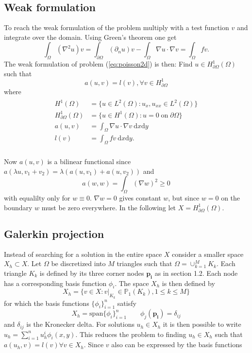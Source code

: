 \documentclass[paper=a4, fontsize=11pt]{scrartcl} %
\begin{document}
\subsection{Weak formulation}
To reach the weak formulation of the problem multiply with a test function $v$ and integrate over the domain. Using Green's theorem one get 
\[\int_{\Omega}  (\nabla^2u)v = \int_{\partial\Omega} (\partial_n u) v -\int_{\Omega} \nabla u \cdot \nabla v = \int_{\Omega} f v.\]
The weak formulation of problem (\ref{eq:poisson2d}) is then: Find $u\in H^1_{\partial\Omega}(\Omega)$ such that
\[a(u,v) = l(v), \forall v \in H^1_{\partial\Omega}\]
where 
\begin{eqnarray}
\begin{aligned}
H^1(\Omega) &= \{u \in L^2(\Omega) : u_x, u_{xx} \in L^2(\Omega)\} \\
H^1_{\partial\Omega}(\Omega) &= \{u\in H^1(\Omega) : u=0 \; \mathrm{on} \;  \partial\Omega\} \\
a(u,v) &= \int_{\Omega} \nabla u\cdot\nabla v \: \mathrm{d}x\mathrm{d}y\\
l(v) &= \int_{\Omega} f v \: \mathrm{d}x\mathrm{d}y.\\
\end{aligned}
\label{eq:poisson2d:Weak}
\end{eqnarray}

Now $a(u,v)$ is a bilinear functional since $a(\lambda u,v_1+v_2)=\lambda\left(a(u,v_1)+a(u,v_2)\right)$ and
\[a(w,w)=\int_{\Omega} (\nabla w)^2 \geq 0\] 
with equalilty only for $w\equiv 0$. $\nabla w=0$ gives constant $w$, but since $w=0$ on the boundary $w$ must be zero everywhere. In the following let $X=H^1_{\partial\Omega}(\Omega)$.

\subsection{Galerkin projection}
Instead of searching for a solution in the entire space $X$ consider a smaller space $X_h \subset X$. Let $\Omega$ be discretized into $M$ triangles such that $\Omega = \cup^M_{k=1} K_k$. Each triangle $K_k$ is defined by its three corner nodes $\mathbf{p_i}$ as in section 1.2. Each node has a corresponding basis function $\phi_i$. The space $X_h$ is then defined by
\[ X_h = \{v \in X : v|_{K_k} \in \mathbb{P}_1(K_k),1\leq k\leq M\}\] 
for which the basis functions $\{\phi_i\}^n_{i=1}$ satisfy
\[ X_h = \mathrm{span}\{\phi_i\}^n_{i=1} \qquad \phi_j(\mathbf{p_i})=\delta_{ij}\]
and $\delta_{ij}$ is the Kronecker delta. For solutions $u_h \in X_h$ it is then possible to write $u_h=\sum^n_{i=1} u^i_h\phi_i(x,y)$. This reduces the problem to finding $u_h \in X_h$ such that $a(u_h,v)=l(v) \forall v\in X_h$.
Since $v$ also can be expressed by the basis functions
\end{document}
